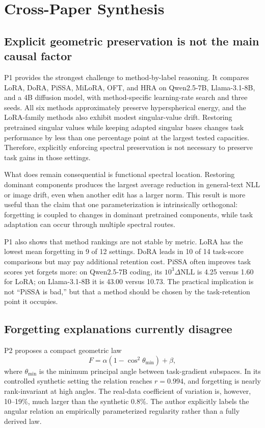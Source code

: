 \documentclass[11pt]{article}
\begin{document}
\section{Cross-Paper Synthesis}

\subsection{Explicit geometric preservation is not the main causal factor}

P1 provides the strongest challenge to method-by-label reasoning. It compares LoRA, DoRA, PiSSA, MiLoRA, OFT, and HRA on Qwen2.5-7B, Llama-3.1-8B, and a 4B diffusion model, with method-specific learning-rate search and three seeds. All six methods approximately preserve hyperspherical energy, and the LoRA-family methods also exhibit modest singular-value drift. Restoring pretrained singular values while keeping adapted singular bases changes task performance by less than one percentage point at the largest tested capacities. Therefore, explicitly enforcing spectral preservation is not necessary to preserve task gains in those settings.

What does remain consequential is functional spectral location. Restoring dominant components produces the largest average reduction in general-text NLL or image drift, even when another edit has a larger norm. This result is more useful than the claim that one parameterization is intrinsically orthogonal: forgetting is coupled to changes in dominant pretrained components, while task adaptation can occur through multiple spectral routes.

P1 also shows that method rankings are not stable by metric. LoRA has the lowest mean forgetting in 9 of 12 settings. DoRA leads in 10 of 14 task-score comparisons but may pay additional retention cost. PiSSA often improves task scores yet forgets more: on Qwen2.5-7B coding, its $10^3\Delta\mathrm{NLL}$ is 4.25 versus 1.60 for LoRA; on Llama-3.1-8B it is 43.00 versus 10.73. The practical implication is not ``PiSSA is bad,'' but that a method should be chosen by the task-retention point it occupies.

\subsection{Forgetting explanations currently disagree}

P2 proposes a compact geometric law
\begin{equation}
F=\alpha(1-\cos^2\theta_{\min})+\beta,
\label{eq:angle}
\end{equation}
where $\theta_{\min}$ is the minimum principal angle between task-gradient subspaces. In its controlled synthetic setting the relation reaches $r=0.994$, and forgetting is nearly rank-invariant at high angles. The real-data coefficient of variation is, however, 10--19\%, much larger than the synthetic 0.8\%. The author explicitly labels the angular relation an empirically parameterized regularity rather than a fully derived law.
\end{document}
